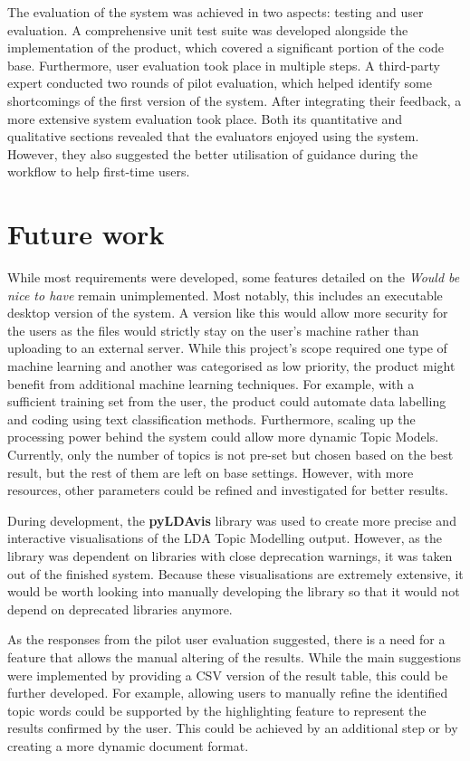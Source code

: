 \documentclass{l4proj}
\begin{document}
The evaluation of the system was achieved in two aspects: testing and user evaluation. A comprehensive unit test suite was developed alongside the implementation of the product, which covered a significant portion of the code base. Furthermore, user evaluation took place in multiple steps. A third-party expert conducted two rounds of pilot evaluation, which helped identify some shortcomings of the first version of the system. After integrating their feedback, a more extensive system evaluation took place. Both its quantitative and qualitative sections revealed that the evaluators enjoyed using the system. However, they also suggested the better utilisation of guidance during the workflow to help first-time users.

\section{Future work}
While most requirements were developed, some features detailed on the \textit{Would be nice to have} remain unimplemented. Most notably, this includes an executable desktop version of the system. A version like this would allow more security for the users as the files would strictly stay on the user's machine rather than uploading to an external server. While this project's scope required one type of machine learning and another was categorised as low priority, the product might benefit from additional machine learning techniques. For example, with a sufficient training set from the user, the product could automate data labelling and coding using text classification methods. Furthermore, scaling up the processing power behind the system could allow more dynamic Topic Models. Currently, only the number of topics is not pre-set but chosen based on the best result, but the rest of them are left on base settings. However, with more resources, other parameters could be refined and investigated for better results.

During development, the \textbf{pyLDAvis} library was used to create more precise and interactive visualisations of the LDA Topic Modelling output. However, as the library was dependent on libraries with close deprecation warnings, it was taken out of the finished system. Because these visualisations are extremely extensive, it would be worth looking into manually developing the library so that it would not depend on deprecated libraries anymore.

As the responses from the pilot user evaluation suggested, there is a need for a feature that allows the manual altering of the results. While the main suggestions were implemented by providing a CSV version of the result table, this could be further developed. For example, allowing users to manually refine the identified topic words could be supported by the highlighting feature to represent the results confirmed by the user. This could be achieved by an additional step or by creating a more dynamic document format.
\end{document}
